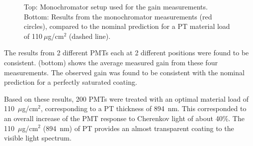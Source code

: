 \begin{figure}
	\caption{Top: Monochromator setup used for the gain measurements. Bottom: Results from the monochromator
          measurements (red circles), compared to the nominal prediction for a PT material load of 110$~\mu$g/cm$^2$
          (dashed line).}
	\label{fig:pmtTestingSetupAndptQEResults}
\end{figure}

The results from 2 different PMTs each at 2 different positions were found to be
consistent.  (bottom) shows the average measured gain from these four
measurements. The observed gain was found to be consistent with the nominal
prediction for a perfectly saturated coating.

Based on these results, 200 PMTs were treated \cite{Joosten:2016lcl} with an optimal material load of
110~$\mu$g/cm$^2$, corresponding to a PT thickness of 894~nm. This corresponded to an overall
increase of the PMT response to Cherenkov light of about 40\%. The 110~$\mu$g/cm$^2$ (894~nm) of PT provides an
almost transparent coating to the visible light spectrum.
